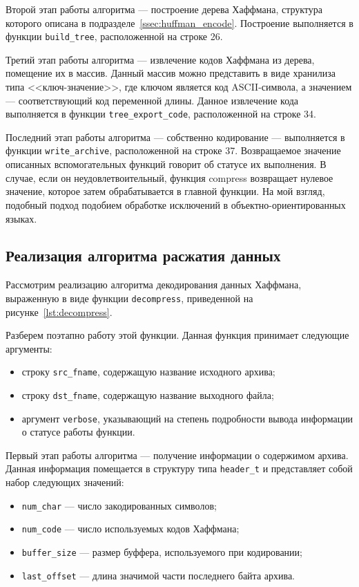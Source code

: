 Второй этап работы алгоритма --- построение дерева Хаффмана, структура которого
описана в подразделе~\ref{ssec:huffman_encode}.
Построение выполняется в функции \texttt{build\_tree}, расположенной на строке 26.

Третий этап работы алгоритма --- извлечение кодов Хаффмана из дерева, помещение
их в массив. Данный массив можно представить в виде хранилиза типа
<<ключ-значение>>, где ключом является код ASCII-символа, 
а значением --- соответствующий код переменной длины.
Данное извлечение кода выполняется в функции \texttt{tree\_export\_code}, 
расположенной на строке 34.

Последний этап работы алгоритма --- собственно кодирование --- выполняется
в функции \texttt{write\_archive}, расположенной на строке 37.
Возвращаемое значение описанных вспомогательных функций говорит об статусе
их выполнения.
В случае, если он неудовлетвоительный, функция compress возвращает нулевое
значение, которое затем обрабатывается в главной функции.
На мой взгляд, подобный подход подобием
обработке исключений в объектно-ориентированных языках.

\subsection{Реализация алгоритма расжатия данных}

Рассмотрим реализацию алгоритма декодирования данных Хаффмана,
выраженную в виде функции \texttt{decompress},
приведенной на рисунке~\ref{lst:decompress}.

Разберем поэтапно работу этой функции. 
Данная функция принимает следующие аргументы:
\begin{itemize}
\item строку \texttt{src\_fname}, содержащую название исходного архива;
\item строку \texttt{dst\_fname}, содержащую название выходного файла;
\item аргумент \texttt{verbose}, указывающий на степень подробности вывода
  информации о статусе работы функции.
\end{itemize}

Первый этап работы алгоритма --- получение информации о содержимом архива.
Данная информация помещается в структуру типа \texttt{header\_t} и 
представляет собой набор следующих значений:
\begin{itemize}
  \item \texttt{num\_char} --- число закодированных символов;
  \item \texttt{num\_code} --- число используемых кодов Хаффмана;
  \item \texttt{buffer\_size} --- размер буффера, используемого при кодировании;
  \item \texttt{last\_offset} --- длина значимой части последнего байта архива.
\end{itemize}

